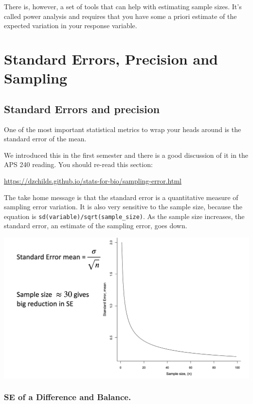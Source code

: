 \documentclass[
]{book}
\begin{document}
There is, however, a set of tools that can help with estimating sample sizes. It's called power analysis and requires that you have some a priori estimate of the expected variation in your response variable.

\hypertarget{standard-errors-precision-and-sampling}{%
\chapter{Standard Errors, Precision and Sampling}\label{standard-errors-precision-and-sampling}}

\hypertarget{standard-errors-and-precision}{%
\section{Standard Errors and precision}\label{standard-errors-and-precision}}

One of the most important statistical metrics to wrap your heads around is the standard error of the mean.

We introduced this in the first semester and there is a good discussion of it in the APS 240 reading. You should re-read this section:

\url{https://dzchilds.github.io/stats-for-bio/sampling-error.html}

The take home message is that the standard error is a quantitative measure of sampling error variation. It is also very sensitive to the sample size, because the equation is \texttt{sd(variable)/sqrt(sample\_size)}. As the sample size increases, the standard error, an estimate of the sampling error, goes down.

\includegraphics[width=34.86in]{images/Standard_Error}

\hypertarget{se-of-a-difference-and-balance.}{%
\subsection{SE of a Difference and Balance.}\label{se-of-a-difference-and-balance.}}
\end{document}

